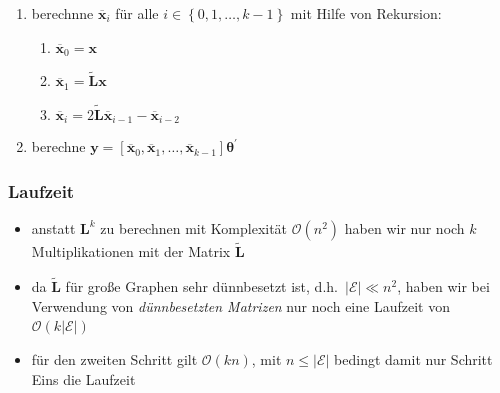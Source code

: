 \begin{enumerate}
  \item berechnne $\mathbf{\overline{x}}_i$ für alle $i \in \left\{ 0, 1, \ldots, k-1 \right\}$ mit Hilfe von Rekursion:
  \begin{enumerate}
    \item $\mathbf{\overline{x}}_0 = \mathbf{x}$
    \item $\mathbf{\overline{x}}_1 = \mathbf{\tilde L} \mathbf{x}$
    \item $\mathbf{\overline{x}}_i = 2\mathbf{\tilde L} \mathbf{\overline{x}}_{i-1} - \mathbf{\overline{x}}_{i-2}$
  \end{enumerate}
\item berechne $\mathbf{y} = \left[\mathbf{\overline{x}}_0, \mathbf{\overline{x}}_1, \ldots, \mathbf{\overline{x}}_{k-1} \right] \mathbf{\theta}^{\prime}$
\end{enumerate}

\subsubsection{Laufzeit}

 \begin{itemize}
   \item anstatt $\mathbf{L}^k$ zu berechnen mit Komplexität $\mathcal{O}\left(n^2\right)$ haben wir nur noch $k$ Multiplikationen mit der Matrix $\mathbf{\tilde L}$
   \item da $\mathbf{\tilde L}$ für große Graphen sehr dünnbesetzt ist, d.h.\ $\left|\mathcal{E}\right| \ll n^2$, haben wir bei Verwendung von \emph{dünnbesetzten Matrizen} nur noch eine Laufzeit von $\mathcal{O}\left(k\left|\mathcal{E}\right|\right)$~\cite{Hammond, Defferrard}
   \item für den zweiten Schritt gilt $\mathcal{O}\left(kn\right)$, mit $n \leq \left|\mathcal{E}\right|$ bedingt damit nur Schritt Eins die Laufzeit
 \end{itemize}
